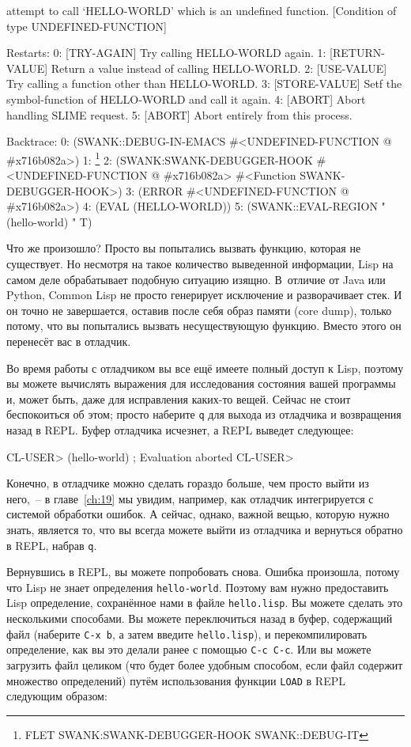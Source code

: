 \begin{myverb}
attempt to call `HELLO-WORLD' which is an undefined function.
   [Condition of type UNDEFINED-FUNCTION]

Restarts:
   0: [TRY-AGAIN] Try calling HELLO-WORLD again.
   1: [RETURN-VALUE] Return a value instead of calling HELLO-WORLD.
   2: [USE-VALUE] Try calling a function other than HELLO-WORLD.
   3: [STORE-VALUE] Setf the symbol-function of HELLO-WORLD and call it again.
   4: [ABORT] Abort handling SLIME request.
   5: [ABORT] Abort entirely from this process.

Backtrace:
  0: (SWANK::DEBUG-IN-EMACS #<UNDEFINED-FUNCTION @ #x716b082a>)
  1: \footnote{FLET SWANK:SWANK-DEBUGGER-HOOK SWANK::DEBUG-IT}
  2: (SWANK:SWANK-DEBUGGER-HOOK #<UNDEFINED-FUNCTION @ #x716b082a> 
                                #<Function SWANK-DEBUGGER-HOOK>)
  3: (ERROR #<UNDEFINED-FUNCTION @ #x716b082a>)
  4: (EVAL (HELLO-WORLD))
  5: (SWANK::EVAL-REGION "(hello-world)
" T)
\end{myverb}

Что же произошло? Просто вы попытались вызвать функцию, которая не сущес\-твует. Но несмотря
на такое количество выведенной информации, Lisp на самом деле обрабатывает подобную ситуацию
изящно. В~отличие от Java или Python, Common Lisp не просто генерирует исключение и
разворачивает стек. И он точно не завершается, оставив после себя образ памяти (core
dump), только потому, что вы попытались вызвать несуществующую функцию. Вместо этого он
перенесёт вас в отладчик.

Во время работы с отладчиком вы все ещё имеете полный доступ к Lisp, поэтому вы можете
вычислять выражения для исследования состояния вашей программы и, может быть, даже для
исправления каких-то вещей. Сейчас не стоит беспокоиться об этом; просто наберите \texttt{q} для
выхода из отладчика и возвращения назад в REPL. Буфер отладчика исчезнет, а REPL выведет
следующее:

\begin{myverb}
CL-USER> (hello-world) 
; Evaluation aborted
CL-USER>
\end{myverb}

Конечно, в отладчике можно сделать гораздо больше, чем просто выйти из него,~-- в
главе~\ref{ch:19} мы увидим, например, как отладчик интегрируется с системой обработки
ошибок.  А сейчас, однако, важной вещью, которую нужно знать, является то, что вы всегда
можете выйти из отладчика и вернуться обратно в REPL, набрав \texttt{q}.

Вернувшись в REPL, вы можете попробовать снова. Ошибка произошла, потому что Lisp не знает
определения \lstinline{hello-world}. Поэтому вам нужно предоставить Lisp определение, сохранённое нами
в файле \texttt{hello.lisp}. Вы можете сделать это несколькими способами. Вы можете переключиться
назад в буфер, содержащий файл (наберите \texttt{C-x b}, а затем введите \texttt{hello.lisp}), и
перекомпилировать определение, как вы это делали ранее с помощью \texttt{C-c C-c}. Или вы можете
загрузить файл целиком (что будет более удобным способом, если файл содержит множество
определений) путём использования функции \lstinline{LOAD} в REPL следующим образом:

